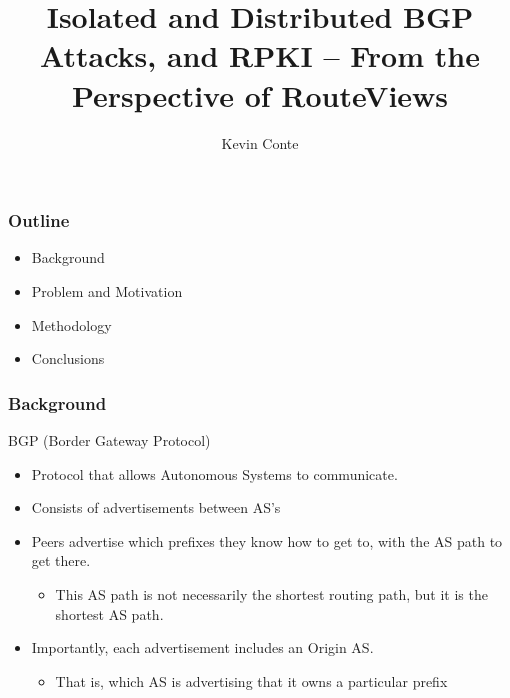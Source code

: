 \documentclass{beamer}
\title{
Isolated and Distributed BGP Attacks, and RPKI -- From the Perspective of RouteViews
}
\author{Kevin Conte}
\begin{document}
\begin{frame}
    \maketitle
\end{frame}

\begin{frame}
    \frametitle{Outline}
    \begin{itemize}
        \item Background
        \item Problem and Motivation
        \item Methodology
        \item Conclusions
    \end{itemize}
\end{frame}

\begin{frame}
    \frametitle{Background}
    \pause
    {\Large BGP (Border Gateway Protocol)}
    \pause
    \begin{itemize}
        \item Protocol that allows Autonomous Systems to communicate. \pause
        \item Consists of advertisements between AS's \pause
        \item Peers advertise which prefixes they know how to get to, with the AS path to get there. \pause
        \begin{itemize}
            \item This AS path is not necessarily the shortest routing path, but it is the shortest AS path. \pause
        \end{itemize}
        \item Importantly, each advertisement includes an Origin AS. \pause
        \begin{itemize}
            \item That is, which AS is advertising that it owns a particular prefix
        \end{itemize}
    \end{itemize}
\end{frame}
\end{document}
